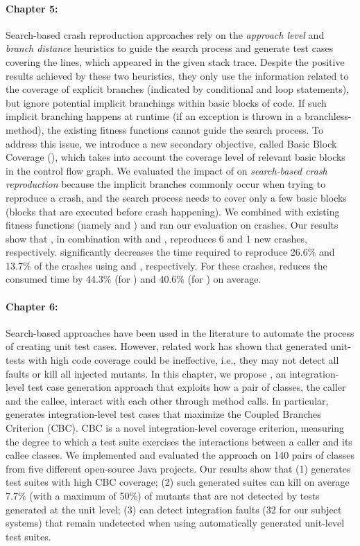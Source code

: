 \paragraph{Chapter 5:}%
Search-based crash reproduction approaches rely on the \emph{approach level} and \emph{branch distance} heuristics to guide the search process and generate test cases covering the lines, which appeared in the given stack trace.
Despite the positive results achieved by these two heuristics, they only use the information related to the coverage of explicit branches (\eg indicated by conditional and loop statements), but ignore potential implicit branchings within basic blocks of code. 
If such implicit branching happens at runtime (\eg if an exception is thrown in a branchless-method), the existing fitness functions cannot guide the search process. 
To address this issue, we introduce a new secondary objective, called Basic Block Coverage (\bbc), which takes into account the coverage level of relevant basic blocks in the control flow graph. We evaluated the impact of \bbc on \emph{search-based crash reproduction} because the implicit branches commonly occur when trying to reproduce a crash, and the search process needs to cover only a few basic blocks (\ie blocks that are executed before crash happening). We combined \bbc with existing fitness functions (namely \integ and \WS) and ran our evaluation on \crashpack crashes.
Our results show that \bbc, in combination with \integ and \WS, reproduces 6 and 1 new crashes, respectively.
\bbc significantly decreases the time required to reproduce 26.6\% and 13.7\% of the crashes using \integ and \WS, respectively. For these crashes, \bbc reduces the consumed time by 44.3\% (for \integ) and 40.6\% (for \WS) on average.

\paragraph{Chapter 6:}%
Search-based approaches have been used in the literature to automate the process of creating unit test cases. However, related work has shown that generated unit-tests with high code coverage could be ineffective, i.e., they may not detect all faults or kill all injected mutants. 
In this chapter, we propose \cling, an integration-level test case generation approach that exploits how a pair of classes, the caller and the callee, interact with each other through method calls. In particular, \cling generates integration-level test cases that maximize the Coupled Branches Criterion (CBC). CBC is a novel integration-level coverage criterion, measuring the degree to which a test suite exercises the interactions between a caller and its callee classes. 
We implemented \cling and evaluated the approach on 140 pairs of classes from five different open-source Java projects. Our results show that (1) \cling generates test suites with high CBC coverage; (2) such generated suites can kill 
on average 7.7\% (with a maximum of 50\%) of mutants that are not detected by tests generated at the unit level; (3) \cling can detect integration faults (32 for our subject systems) that remain undetected when using automatically generated unit-level test suites. 

